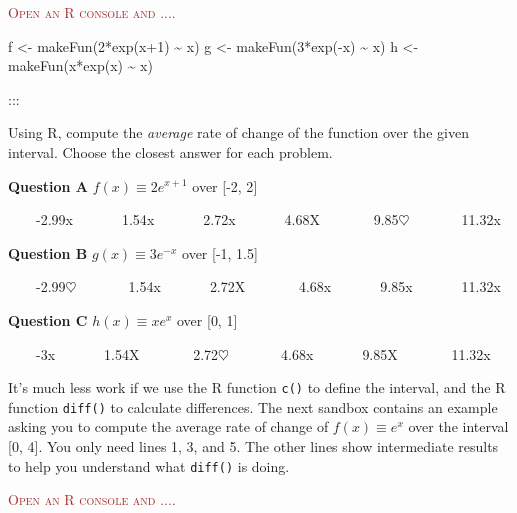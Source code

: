 \documentclass[
  letterpaper,
  DIV=11,
  numbers=noendperiod,
  oneside]{article}
\newenvironment{Shaded}{\begin{snugshade}}{\end{snugshade}}
\newcommand{\DecValTok}[1]{\textcolor[rgb]{0.68,0.00,0.00}{#1}}
\newcommand{\FunctionTok}[1]{\textcolor[rgb]{0.28,0.35,0.67}{#1}}
\newcommand{\NormalTok}[1]{\textcolor[rgb]{0.00,0.23,0.31}{#1}}
\newcommand{\OtherTok}[1]{\textcolor[rgb]{0.00,0.23,0.31}{#1}}
\newcommand{\SpecialCharTok}[1]{\textcolor[rgb]{0.37,0.37,0.37}{#1}}
\newenvironment{scaffolding}%
{%
\textcolor{brown}{\hrulefill}%
  \par\vspace{.3\baselineskip}%
  \textcolor{brown}{\scshape Open an R console and ....}%
  \par\vspace{\baselineskip}%
}%
{\textcolor{brown}{\hrulefill}}
\begin{document}
\begin{multicols}{2}
\begin{scaffolding}
\begin{Shaded}
\begin{Highlighting}[]
\NormalTok{f }\OtherTok{\textless{}{-}} \FunctionTok{makeFun}\NormalTok{(}\DecValTok{2}\SpecialCharTok{*}\FunctionTok{exp}\NormalTok{(x}\SpecialCharTok{+}\DecValTok{1}\NormalTok{) }\SpecialCharTok{\textasciitilde{}}\NormalTok{ x)}
\NormalTok{g }\OtherTok{\textless{}{-}} \FunctionTok{makeFun}\NormalTok{(}\DecValTok{3}\SpecialCharTok{*}\FunctionTok{exp}\NormalTok{(}\SpecialCharTok{{-}}\NormalTok{x) }\SpecialCharTok{\textasciitilde{}}\NormalTok{ x)}
\NormalTok{h }\OtherTok{\textless{}{-}} \FunctionTok{makeFun}\NormalTok{(x}\SpecialCharTok{*}\FunctionTok{exp}\NormalTok{(x) }\SpecialCharTok{\textasciitilde{}}\NormalTok{ x)}
\end{Highlighting}
\end{Shaded}

\end{scaffolding}

:::

Using R, compute the \emph{average} rate of change of the function over
the given interval. Choose the closest answer for each problem.

\textbf{Question A} \(f(x) \equiv 2 e^{x+1}\) over {[}-2, 2{]}

~~~~{-2.99{x}}~~~~~~~{1.54{x}}~~~~~~~{2.72{x}}~~~~~~~{4.68{︎X
}}~~~~~~~{9.85{\(\heartsuit\ \)}}~~~~~~~{11.32{x}}

\textbf{Question B} \(g(x) \equiv 3 e^{-x}\) over {[}-1, 1.5{]}

~~~~{-2.99{\(\heartsuit\ \)}}~~~~~~~{1.54{x}}~~~~~~~{2.72{︎X
}}~~~~~~~{4.68{x}}~~~~~~~{9.85{x}}~~~~~~~{11.32{x}}

\textbf{Question C} \(h(x) \equiv x e^x\) over {[}0, 1{]}

~~~~{-3{x}}~~~~~~~{1.54{︎X
}}~~~~~~~{2.72{\(\heartsuit\ \)}}~~~~~~~{4.68{x}}~~~~~~~{9.85{︎X
}}~~~~~~~{11.32{x}}

It's much less work if we use the R function \texttt{c()} to define the
interval, and the R function \texttt{diff()} to calculate differences.
The next sandbox contains an example asking you to compute the average
rate of change of \(f(x) \equiv e^x\) over the interval {[}0, 4{]}. You
only need lines 1, 3, and 5. The other lines show intermediate results
to help you understand what \texttt{diff()} is doing.

\begin{scaffolding}


\end{scaffolding}
\end{multicols}
\end{document}
